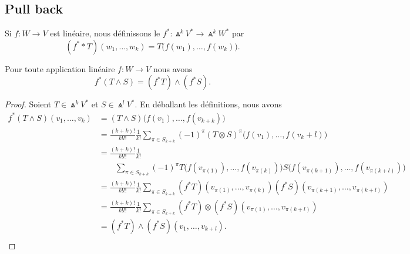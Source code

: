 \subsection{Pull back}

\begin{definition}
	Si \(f \colon W\to V  \) est linéaire, nous définissons le  \(f^* \colon \Wedge^kV^*\to \Wedge^kW^*  \) par
	\begin{equation}
		(f^**T)(w_1,\ldots,w_k)=T\big( f(w_1),\ldots,f(w_k) \big).
	\end{equation}
\end{definition}

\begin{proposition}
	Pour toute application linéaire \(f \colon W\to V  \) nous avons
	\begin{equation}
		f^*(T\wedge S)=(f^*T)\wedge (f^*S).
	\end{equation}
\end{proposition}

\begin{proof}
	Soient \( T\in \Wedge^kV^*\) et \( S\in\Wedge^lV^*\). En déballant les définitions, nous avons
	\begin{subequations}
		\begin{align}
			f^*(T\wedge S)(v_1,\ldots,v_k) & =(T\wedge S)\big( f(v_1),\ldots,f(v_{k+k}) \big)                                                                                                      \\
			                               & =\frac{ (k+k)! }{ k!l! }\frac{1}{ k!}\sum_{\pi\in S_{k+k}}(-1)^{\pi}(T\otimes S)^{\pi}\big( f(v_1),\ldots,f(v_k+l) \big)                              \\
			                               & =\frac{ (k+k)! }{ k!l! }\frac{1}{ k!}                                                                                                                 \\
			                               & \qquad \nonumber\sum_{\pi\in S_{k+k}}   (-1)^{\pi}T\big( f(v_{\pi(1)}),\ldots,f(v_{\pi(k)}) \big)S\big( f(v_{\pi(k+1)}),\ldots, f(v_{\pi(k+l)}) \big) \\
			                               & =\frac{ (k+k)! }{ k!l! }\frac{1}{ k!}\sum_{\pi\in S_{k+k}}  (f^*T)(v_{\pi(1)},\ldots,v_{\pi(k)})(f^*S)(v_{\pi(k+1)},\ldots,v_{\pi(k+l)})              \\
			                               & =\frac{ (k+k)! }{ k!l! }\frac{1}{ k!}\sum_{\pi\in S_{k+k}}  (f^*T)\otimes (f^*S) (v_{\pi(1)},\ldots,v_{\pi(k+l)})                                     \\
			                               & =   (f^*T)\wedge (f^*S)(v_1,\ldots,v_{k+l}).                                                                                                          \\
		\end{align}
	\end{subequations}
\end{proof}

